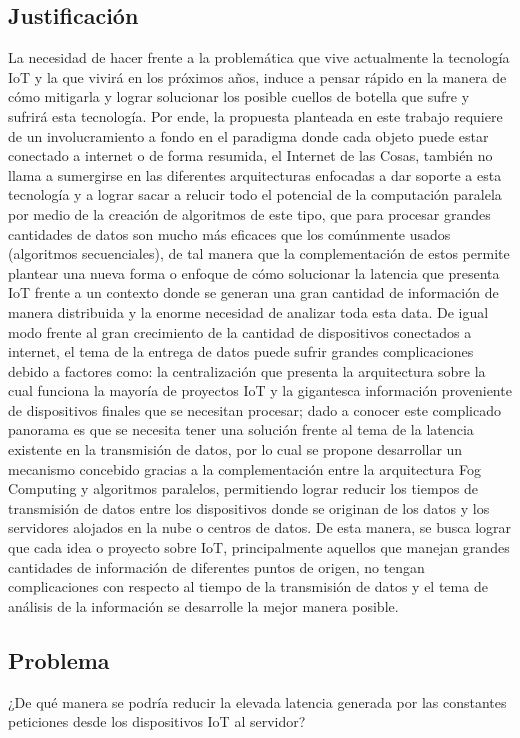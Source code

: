     \subsection{Justificación}
        La necesidad de hacer frente a la problemática que vive actualmente la tecnología IoT y la que vivirá en los próximos años, induce a pensar rápido en la manera de cómo mitigarla y lograr solucionar los posible cuellos de botella que sufre y sufrirá esta tecnología. Por ende, la propuesta planteada en este trabajo requiere de un involucramiento a fondo en el paradigma donde cada objeto puede estar conectado a internet o de forma resumida, el Internet de las Cosas, también no llama a sumergirse en las diferentes arquitecturas enfocadas a dar soporte a esta tecnología y a lograr sacar a relucir todo el potencial de la computación paralela por medio de la creación de algoritmos de este tipo, que para procesar grandes cantidades de datos son mucho más eficaces que los comúnmente usados (algoritmos secuenciales), de tal manera que la complementación de estos permite plantear una nueva forma o enfoque de cómo solucionar la latencia que presenta IoT frente a un contexto donde se generan una gran cantidad de información de manera distribuida y la enorme necesidad de analizar toda esta data. De igual modo frente al gran crecimiento de la cantidad de dispositivos conectados a internet, el tema de la entrega de datos puede sufrir grandes complicaciones debido a factores como: la centralización que presenta la arquitectura sobre la cual funciona la mayoría de proyectos IoT y la gigantesca información proveniente de dispositivos finales que se necesitan procesar; dado a conocer este complicado panorama es que se necesita tener una solución frente al tema de la latencia existente en la transmisión de datos, por lo cual se propone desarrollar un mecanismo concebido gracias a la complementación entre la arquitectura Fog Computing y algoritmos paralelos, permitiendo lograr reducir los tiempos de transmisión de datos entre los dispositivos donde se originan de los datos y los servidores alojados en la nube o centros de datos. De esta manera, se busca lograr que cada idea o proyecto sobre IoT, principalmente aquellos que manejan grandes cantidades de información de diferentes puntos de origen, no tengan complicaciones con respecto al tiempo de la transmisión de datos y el tema de análisis de la información se desarrolle la mejor manera posible.
    \subsection{Problema}
        ¿De qué manera se podría reducir la elevada latencia generada por las constantes peticiones desde los dispositivos IoT al servidor?\par
